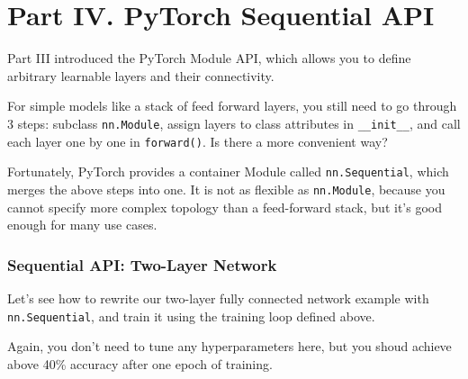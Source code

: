 \documentclass[11pt]{article}
\begin{document}
    \section{Part IV. PyTorch Sequential
API}\label{part-iv.-pytorch-sequential-api}

Part III introduced the PyTorch Module API, which allows you to define
arbitrary learnable layers and their connectivity.

For simple models like a stack of feed forward layers, you still need to
go through 3 steps: subclass \texttt{nn.Module}, assign layers to class
attributes in \texttt{\_\_init\_\_}, and call each layer one by one in
\texttt{forward()}. Is there a more convenient way?

Fortunately, PyTorch provides a container Module called
\texttt{nn.Sequential}, which merges the above steps into one. It is not
as flexible as \texttt{nn.Module}, because you cannot specify more
complex topology than a feed-forward stack, but it's good enough for
many use cases.

\subsubsection{Sequential API: Two-Layer
Network}\label{sequential-api-two-layer-network}

Let's see how to rewrite our two-layer fully connected network example
with \texttt{nn.Sequential}, and train it using the training loop
defined above.

Again, you don't need to tune any hyperparameters here, but you shoud
achieve above 40\% accuracy after one epoch of training.
\end{document}
